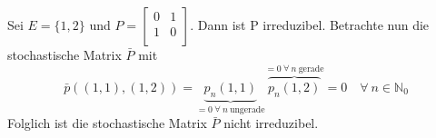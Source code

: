 Sei $E= \lbrace 1,2 \rbrace$ und 
$P = \begin{bmatrix}
0 & 1 \\
1  & 0 \\
\end{bmatrix}$.
Dann ist P irreduzibel. Betrachte nun die stochastische Matrix $\bar{P}$ mit 
\begin{equation*}
\bar{p} \left( (1,1),(1,2) \right) = \underbrace{p_{n}(1,1)}_{= 0 \: \forall \: n \: \mathrm{ungerade}} \overbrace{p_{n}(1,2)}^{= 0 \: \forall \: n \: \mathrm{gerade}} = 0 \quad \forall \: n \in \mathbb{N}_{0}
\end{equation*}
Folglich ist die stochastische Matrix $\bar{P}$ nicht irreduzibel.
